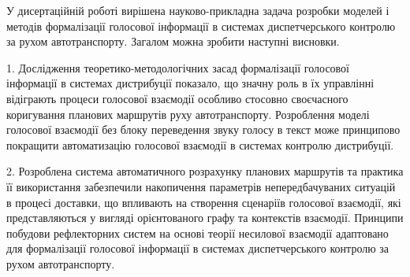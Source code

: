 У дисертаційній роботі вирішена науково-прикладна задача розробки моделей і методів формалізації голосової інформації в системах диспетчерського контролю за рухом автотранспорту. Загалом можна зробити наступні висновки.

1. Дослідження теоретико-методологічних засад формалізації голосової інформації в системах дистрибуції показало, що значну роль в їх управлінні відіграють процеси голосової взаємодії особливо стосовно своєчасного коригування планових маршрутів руху автотранспорту. Розроблення моделі голосової взаємодії без блоку переведення звуку голосу в текст може принципово покращити автоматизацію голосової взаємодії в системах контролю дистрибуції.


2. Розроблена система автоматичного розрахунку планових маршрутів та практика її використання забезпечили накопичення параметрів непередбачуваних ситуацій в процесі доставки, що впливають на створення сценаріїв голосової взаємодії, які представляються у вигляді орієнтованого графу та контекстів взаємодії. 
Принципи побудови рефлекторних систем на основі теорії несилової взаємодії адаптовано для формалізації голосової інформації в системах диспетчерського контролю за рухом автотранспорту.


